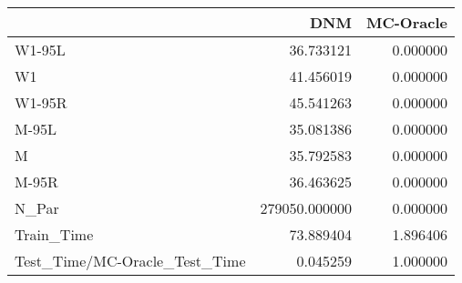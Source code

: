 \begin{tabular}{lrr}
\toprule
{} &            DNM &  MC-Oracle \\
\midrule
W1-95L                        &      36.733121 &   0.000000 \\
W1                            &      41.456019 &   0.000000 \\
W1-95R                        &      45.541263 &   0.000000 \\
M-95L                         &      35.081386 &   0.000000 \\
M                             &      35.792583 &   0.000000 \\
M-95R                         &      36.463625 &   0.000000 \\
N\_Par                         &  279050.000000 &   0.000000 \\
Train\_Time                    &      73.889404 &   1.896406 \\
Test\_Time/MC-Oracle\_Test\_Time &       0.045259 &   1.000000 \\
\bottomrule
\end{tabular}
